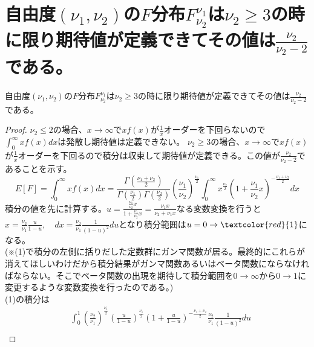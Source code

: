     \section{自由度\texorpdfstring{$(\nu_1,\nu_2)$}{(ν1,ν2)}の\texorpdfstring{$F$}{F}分布\texorpdfstring{$F_{\nu_2}^{\nu_1}$}{F\_ν2\string^ν1}は\texorpdfstring{$\nu_2 \geq 3$}{ν2≧3}の時に限り期待値が定義できてその値は\texorpdfstring{$\frac{\nu_2}{\nu_2-2}$}{ν2/(ν2-2)}である。}
        \begin{shadebox}
            自由度$(\nu_1,\nu_2)$の$F$分布$F_{\nu_2}^{\nu_1}$は$\nu_2 \geq 3$の時に限り期待値が定義できてその値は$\frac{\nu_2}{\nu_2-2}$である。
        \end{shadebox}
        \begin{proof}
            \setcounter{equation}{0}
            \quad\par
            $\nu_2 \leq 2$の場合、$x\to \infty$で$xf(x)$が$\frac{1}{x}$オーダーを下回らないので$\int_{0}^{\infty}{xf(x) dx}$は発散し期待値は定義できない。
            $\nu_2 \geq 3$の場合、$x\to \infty$で$xf(x)$が$\frac{1}{x}$オーダーを下回るので積分は収束して期待値が定義できる。この値が$\frac{\nu_2}{\nu_2-2}$であることを示す。\\
            \begin{equation}
                E[F] = \int_{0}^{\infty}{xf(x) dx} = \frac{\Gamma{\left(\frac{\nu_1+\nu_2}{2}\right)}}{\Gamma{\left(\frac{\nu_1}{2}\right)}\Gamma{\left(\frac{\nu_2}{2}\right)}}\left(\frac{\nu_1}{\nu_2}\right)^{\frac{\nu_1}{2}}\int_{0}^{\infty}{x^{\frac{\nu_2}{2}}\left(1+\frac{\nu_1}{\nu_2}x\right)^{-\frac{\nu_1+\nu_2}{2}} dx}
            \end{equation}
            積分の値を先に計算する。$\displaystyle u = \frac{\frac{\nu_1}{\nu_2}x}{1+\frac{\nu_1}{\nu_2}x} = \frac{\nu_1x}{\nu_2+\nu_1x}$なる変数変換を行うと$x = \frac{\nu_2}{\nu_1}\frac{u}{1-u}, \quad dx = \frac{\nu_2}{\nu_1}\frac{1}{(1-u)^2}du$となり積分範囲は$u=0\to \textcolor{red}{1}$になる。\\
            (※(1)で積分の左側に括りだした定数群にガンマ関数が居る。最終的にこれらが消えてほしいわけだから積分結果がガンマ関数あるいはベータ関数にならなければならない。そこでベータ関数の出現を期待して積分範囲を$0\to\infty$から$0\to 1$に変更するような変数変換を行ったのである。)\\
            (1)の積分は
            \begin{align*}
                & \int_{0}^{1}{\left(\frac{\nu_2}{\nu_1}\right)^{\frac{\nu_1}{2}}\left(\frac{u}{1-u}\right)^{\frac{\nu_1}{2}}\left(1+\frac{u}{1-u}\right)^{-\frac{\nu_1+\nu_2}{2}}\frac{\nu_2}{\nu_1}\frac{1}{(1-u)^2} du}\\

\end{align*}
\end{proof}
